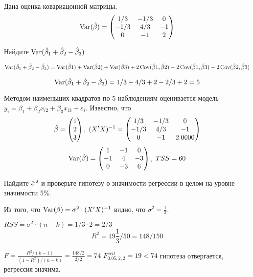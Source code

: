\begin{problem}
Дана оценка ковариацонной матрицы,
\[
\operatorname{Var}(\hat{\beta})=\begin{pmatrix}
1/3 & -1/3 & 0 \\
-1/3 & 4/3 & -1 \\
0 & -1 & 2
\end{pmatrix}
\]

Найдите $\operatorname{Var}(\hat{\beta}_1+\hat{\beta}_2-\hat{\beta}_3)$


\begin{sol}
\[\operatorname{Var}(\hat{\beta}_1+\hat{\beta}_2-\hat{\beta}_3)=\operatorname{Var}(\hat{\beta}1)+\operatorname{Var}(\hat{\beta}2)+\operatorname{Var}(\hat{\beta}3)+
2\operatorname{Cov}(\hat{\beta}1,\hat{\beta}2)-2\operatorname{Cov}(\hat{\beta}1,\hat{\beta}3)-2\operatorname{Cov}(\hat{\beta}2,\hat{\beta}3)\]

\[\operatorname{Var}(\hat{\beta}_1+\hat{\beta}_2-\hat{\beta}_3)=1/3+4/3+2-2/3+2=5\]
\end{sol}
\end{problem}


\begin{problem}
Методом наименьших квадратов по 5 наблюдениям оценивается модель $y_i=\beta_1+\beta_2 x_{i2}+\beta_3 x_{i3}+\varepsilon_i$. Известно, что
\[
\hat{\beta}=\begin{pmatrix}
1 \\
2 \\
3
\end{pmatrix}, \;
(X'X)^{-1}= \begin{pmatrix}
1/3 & -1/3 & 0 \\
-1/3 & 4/3 & -1 \\
0 & -1 & 2.0000
\end{pmatrix}
\]
\[
\operatorname{Var}(\hat{\beta})=\begin{pmatrix}
1 & -1 & 0 \\
-1 & 4 & -3 \\
0 & -3 & 6
\end{pmatrix}, \; TSS=60
\]

Найдите $\hat{\sigma}^2$ и проверьте гипотезу о значимости регрессии в целом на уровне значимости 5\%.


\begin{sol}
Из того, что $\operatorname{Var}(\hat{\beta})=\sigma^2\cdot (X'X)^{-1}$ видно, что $\sigma^2=\frac13$.

$RSS=\sigma^2\cdot(n-k)=1/3\cdot 2=2/3$
\[R^2=49\frac13/50=148/150\]


$F=\frac{R^2/(k-1)}{(1-R^2)/(n-k)}=\frac{148/2}{2/2}=74$
$F^{crit}_{0.05, 2,2}=19<74$
гипотеза отвергается, регрессия значима.

\end{sol}
\end{problem}





